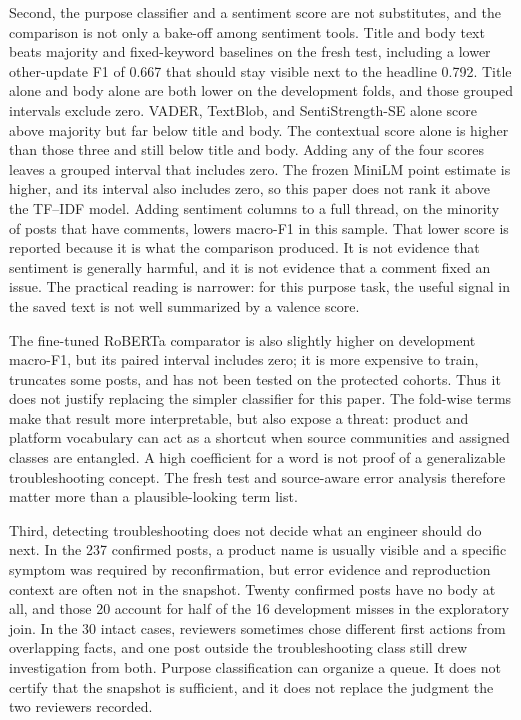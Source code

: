 \documentclass[conference,letterpaper]{IEEEtran}
\begin{document}
Second, the purpose classifier and a sentiment score are not substitutes, and the comparison is not only a bake-off among sentiment tools. Title and body text beats majority and fixed-keyword baselines on the fresh test, including a lower other-update F1 of 0.667 that should stay visible next to the headline 0.792. Title alone and body alone are both lower on the development folds, and those grouped intervals exclude zero. VADER, TextBlob, and SentiStrength-SE alone score above majority but far below title and body. The contextual score alone is higher than those three and still below title and body. Adding any of the four scores leaves a grouped interval that includes zero. The frozen MiniLM point estimate is higher, and its interval also includes zero, so this paper does not rank it above the TF--IDF model. Adding sentiment columns to a full thread, on the minority of posts that have comments, lowers macro-F1 in this sample. That lower score is reported because it is what the comparison produced. It is not evidence that sentiment is generally harmful, and it is not evidence that a comment fixed an issue. The practical reading is narrower: for this purpose task, the useful signal in the saved text is not well summarized by a valence score.

The fine-tuned RoBERTa comparator is also slightly higher on development macro-F1, but its paired interval includes zero; it is more expensive to train, truncates some posts, and has not been tested on the protected cohorts. Thus it does not justify replacing the simpler classifier for this paper. The fold-wise terms make that result more interpretable, but also expose a threat: product and platform vocabulary can act as a shortcut when source communities and assigned classes are entangled. A high coefficient for a word is not proof of a generalizable troubleshooting concept. The fresh test and source-aware error analysis therefore matter more than a plausible-looking term list.

Third, detecting troubleshooting does not decide what an engineer should do next. In the 237 confirmed posts, a product name is usually visible and a specific symptom was required by reconfirmation, but error evidence and reproduction context are often not in the snapshot. Twenty confirmed posts have no body at all, and those 20 account for half of the 16 development misses in the exploratory join. In the 30 intact cases, reviewers sometimes chose different first actions from overlapping facts, and one post outside the troubleshooting class still drew investigation from both. Purpose classification can organize a queue. It does not certify that the snapshot is sufficient, and it does not replace the judgment the two reviewers recorded.
\end{document}
